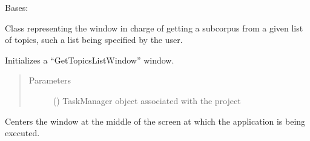 \documentclass[letterpaper,10pt,english]{sphinxmanual}
\begin{document}
\begin{fulllineitems}
\label{\detokenize{gui_get_topics_list_window:src.graphical_user_interface.get_topics_list_window.GetTopicsListWindow}}
\sphinxAtStartPar
Bases: 

\sphinxAtStartPar
Class representing the window in charge of getting a subcorpus from a given
list of topics, such a list being specified by the user.

\begin{fulllineitems}
\label{\detokenize{gui_get_topics_list_window:src.graphical_user_interface.get_topics_list_window.GetTopicsListWindow.__init__}}
\sphinxAtStartPar
Initializes a “GetTopicsListWindow” window.
\begin{quote}\begin{description}
\item[{Parameters}] \leavevmode
\sphinxAtStartPar
{} () \textendash{} TaskManager object associated with the project

\end{description}\end{quote}

\end{fulllineitems}


\begin{fulllineitems}
\label{\detokenize{gui_get_topics_list_window:src.graphical_user_interface.get_topics_list_window.GetTopicsListWindow.center}}
\sphinxAtStartPar
Centers the window at the middle of the screen at which the application is being executed.


\end{fulllineitems}
\end{fulllineitems}
\end{document}
